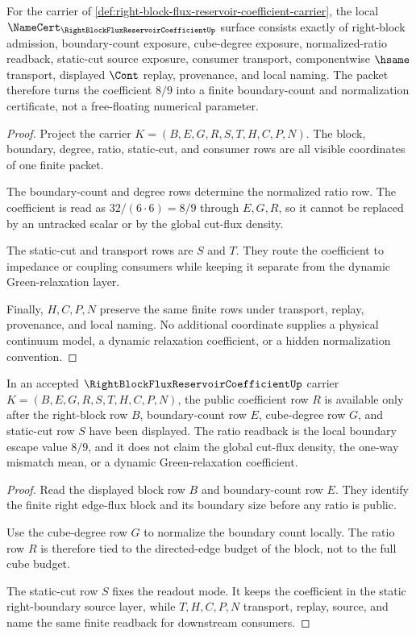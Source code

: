 \begin{theorem}
\label{thm:right-block-flux-reservoir-coefficient-namecert-obligations}
For the carrier of \autoref{def:right-block-flux-reservoir-coefficient-carrier}, the local $\NameCert_{\RightBlockFluxReservoirCoefficientUp}$ surface consists exactly of right-block admission, boundary-count exposure, cube-degree exposure, normalized-ratio readback, static-cut source exposure, consumer transport, componentwise $\hsame$ transport, displayed $\Cont$ replay, provenance, and local naming. The packet therefore turns the coefficient $8/9$ into a finite boundary-count and normalization certificate, not a free-floating numerical parameter.
\end{theorem}
\begin{proof}
Project the carrier $K=(B,E,G,R,S,T,H,C,P,N)$. The block, boundary, degree, ratio, static-cut, and consumer rows are all visible coordinates of one finite packet.

The boundary-count and degree rows determine the normalized ratio row. The coefficient is read as $32/(6\cdot 6)=8/9$ through $E,G,R$, so it cannot be replaced by an untracked scalar or by the global cut-flux density.

The static-cut and transport rows are $S$ and $T$. They route the coefficient to impedance or coupling consumers while keeping it separate from the dynamic Green-relaxation layer.

Finally, $H,C,P,N$ preserve the same finite rows under transport, replay, provenance, and local naming. No additional coordinate supplies a physical continuum model, a dynamic relaxation coefficient, or a hidden normalization convention.
\end{proof}

\begin{theorem}
\label{thm:right-block-flux-reservoir-coefficient-boundary-ratio}
In an accepted $\RightBlockFluxReservoirCoefficientUp$ carrier $K=(B,E,G,R,S,T,H,C,P,N)$, the public coefficient row $R$ is available only after the right-block row $B$, boundary-count row $E$, cube-degree row $G$, and static-cut row $S$ have been displayed. The ratio readback is the local boundary escape value $8/9$, and it does not claim the global cut-flux density, the one-way mismatch mean, or a dynamic Green-relaxation coefficient.
\end{theorem}
\begin{proof}
Read the displayed block row $B$ and boundary-count row $E$. They identify the finite right edge-flux block and its boundary size before any ratio is public.

Use the cube-degree row $G$ to normalize the boundary count locally. The ratio row $R$ is therefore tied to the directed-edge budget of the block, not to the full cube budget.

The static-cut row $S$ fixes the readout mode. It keeps the coefficient in the static right-boundary source layer, while $T,H,C,P,N$ transport, replay, source, and name the same finite readback for downstream consumers.
\end{proof}

